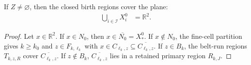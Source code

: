\begin{lemma}
    \label{thm:area_law_initial_closed_cover}
    \leanok
    If $Z\ne\varnothing$, then the closed birth regions cover the plane:
    \begin{align}
        \bigcup_{i\in\mathcal I}X_i^0 & =\mathbb R^2.
    \end{align}
\end{lemma}
\begin{proof}\leanok
    Let $x\in\mathbb R^2$. If $x\in N_0$, then
    $x\in\overline{N_0}=X_*^0$. If $x\notin N_0$, the fine-cell partition
    gives $k\ge k_0$ and $z\in F_{k,\ell_k}$ with
    $x\in C_{\ell_k,z}\subseteq\overline{C_{\ell_k,z}}$.
    If $z\in B_k$, the belt-run regions $T_{k,z,R}$ cover
    $\overline{C_{\ell_k,z}}$.
    If $z\notin B_k$, $\overline{C_{\ell_k,z}}$ lies in a retained primary
    region $R_{k,J}$.
\end{proof}
